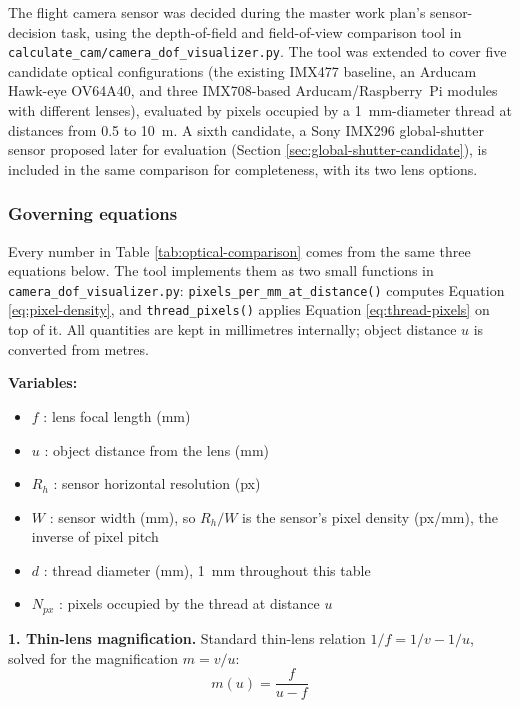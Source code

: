 The flight camera sensor was decided during the master work plan's sensor-decision task, using the depth-of-field and field-of-view comparison tool in \texttt{calculate\_cam/camera\_dof\_visualizer.py}. The tool was extended to cover five candidate optical configurations (the existing IMX477 baseline, an Arducam Hawk-eye OV64A40, and three IMX708-based Arducam/Raspberry~Pi modules with different lenses), evaluated by pixels occupied by a 1~mm-diameter thread at distances from 0.5 to 10~m. A sixth candidate, a Sony IMX296 global-shutter sensor proposed later for evaluation (Section \ref{sec:global-shutter-candidate}), is included in the same comparison for completeness, with its two lens options.

\subsubsection{Governing equations}
\label{sec:thread-pixel-equations}

Every number in Table \ref{tab:optical-comparison} comes from the same three equations below. The tool implements them as two small functions in \texttt{camera\_dof\_\allowbreak visualizer.py}: \texttt{pixels\_per\_\allowbreak mm\_at\_\allowbreak distance()} computes Equation \ref{eq:pixel-density}, and \texttt{thread\_\allowbreak pixels()} applies Equation \ref{eq:thread-pixels} on top of it. All quantities are kept in millimetres internally; object distance $u$ is converted from metres.

\textbf{Variables:}
\begin{itemize}
    \item $f$ : lens focal length (mm)
    \item $u$ : object distance from the lens (mm)
    \item $R_h$ : sensor horizontal resolution (px)
    \item $W$ : sensor width (mm), so $R_h/W$ is the sensor's pixel density (px/mm), the inverse of pixel pitch
    \item $d$ : thread diameter (mm), 1~mm throughout this table
    \item $N_{px}$ : pixels occupied by the thread at distance $u$
\end{itemize}

\textbf{1. Thin-lens magnification.} Standard thin-lens relation $1/f = 1/v - 1/u$, solved for the magnification $m = v/u$:
\begin{equation}
m(u) = \frac{f}{u - f}
\label{eq:magnification}
\end{equation}

